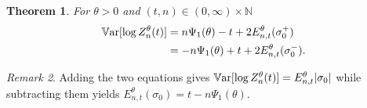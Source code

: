 \documentclass[11pt]{amsart}
\newtheorem{theorem}{\sc Theorem}[section]
\numberwithin{equation}{section}
\theoremstyle{remark}
\newtheorem{remark}[theorem]{Remark}
\begin{document}
\begin{theorem} For ${\theta}>0$ and  $(t,n)\in(0,\infty)\times{\mathbb{N}}$
\begin{equation}\begin{aligned}
 {{\rm\mathbb{V}ar}}[\log Z_n^{\theta}(t)] &= n{\Psi_1}({\theta})-t+2 E^{\theta}_{n,t}(\sigma_0^+)\\
&= -n{\Psi_1}({\theta})+t+2 E^{\theta}_{n,t}(\sigma_0^-). 
\end{aligned}\label{var1}\end{equation}
\label{varthm}\end{theorem}
\begin{remark}
Adding the two equations gives $ {{\rm\mathbb{V}ar}}[\log Z_n^{\theta}(t)] =E^{\theta}_{n,t}|\sigma_0|$ while subtracting them yields $E^{\theta}_{n,t} (\sigma_0)=t-n{\Psi_1}({\theta})$.
\end{remark}
\end{document}
